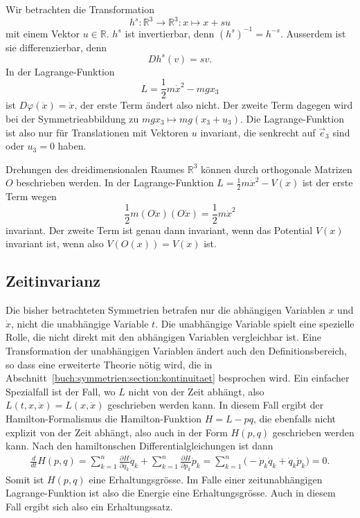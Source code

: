 \begin{beispiel}
\label{buch:symmetrien:symmetrie:beispiel:homogen}
Wir betrachten die Transformation
\[
h^s
\colon
\mathbb{R}^3 \to \mathbb{R}^3
:
x \mapsto x + su
\]
mit einem Vektor $u\in\mathbb{R}$.
$h^s$ ist invertierbar, denn $(h^s)^{-1}=h^{-s}$.
Ausserdem ist sie differenzierbar, denn
\[
Dh^s(v)
=
sv.
\]
In der Lagrange-Funktion
\[
L
=
\frac12m\dot{x}^2 - mgx_3
\]
ist $D\varphi(\dot{x})=\dot{x}$, der erste Term ändert also nicht.
Der zweite Term dagegen wird bei der Symmetrieabbildung zu
$mgx_3\mapsto mg(x_3+u_3)$.
Die Lagrange-Funktion ist also nur für Translationen mit Vektoren $u$
invariant, die senkrecht auf $\vec{e}_3$ sind oder $u_3=0$ haben.
\end{beispiel}

\begin{beispiel}
\label{buch:symmetrien:symmetrie:beispiel:drehung}
Drehungen des dreidimensionalen Raumes $\mathbb{R}^3$ können durch
orthogonale Matrizen $O$ beschrieben werden.
In der Lagrange-Funktion $L=\frac12m\dot{x}^2-V(x)$ ist der erste
Term wegen
\[
\frac12m (O\dot{x})(O\dot{x})
=
\frac12m\dot{x}^2
\]
invariant.
Der zweite Term ist genau dann invariant, wenn das Potential $V(x)$
invariant ist, wenn also $V(O(x))=V(x)$ ist.
\end{beispiel}

%
%
\subsection{Zeitinvarianz}
Die bisher betrachteten Symmetrien betrafen nur die abhängigen
Variablen $x$ und $\dot{x}$, nicht die unabhängige Variable $t$.
Die unabhängige Variable spielt eine spezielle Rolle, die nicht
direkt mit den abhängigen Variablen vergleichbar ist.
Eine Transformation der unabhängigen Variablen ändert auch den
Definitionsbereich, so dass eine erweiterte Theorie nötig wird, 
die in Abschnitt~\ref{buch:symmetrien:section:kontinuitaet}
besprochen wird.
Ein einfacher Spezialfall ist der Fall, wo $L$ nicht von der
Zeit abhängt, also $L(t,x,\dot{x})=L(x,\dot{x})$ geschrieben werden
kann.
In diesem Fall ergibt der Hamilton-Formalismus die Hamilton-Funktion
$H=L-pq$, die ebenfalls nicht explizit von der Zeit abhängt, also
auch in der Form $H(p,q)$ geschrieben werden kann.
Nach den hamiltonschen Differentialgleichungen ist dann
\begin{align*}
\frac{d}{dt}H(p,q)
=
\sum_{k=1}^n
\frac{\partial H}{\partial q_k}\dot{q}_k
+
\sum_{k=1}^n
\frac{\partial H}{\partial p_k}\dot{p}_k
=
\sum_{k=1}^n
\bigl(
-
\dot{p}_k\dot{q}_k
+
\dot{q}_k\dot{p}_k
\bigr)
=
0.
\end{align*}
Somit ist $H(p,q)$ eine Erhaltungsgrösse.
Im Falle einer zeitunabhängigen Lagrange-Funktion ist also die
Energie eine Erhaltungsgrösse.
Auch in diesem Fall ergibt sich also ein Erhaltungssatz.

